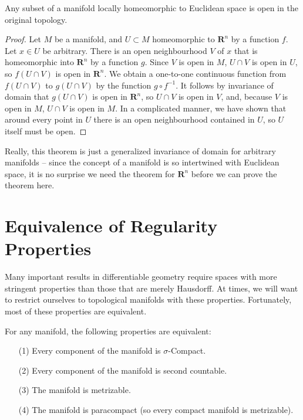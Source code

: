 \begin{theorem}
    Any subset of a manifold locally homeomorphic to Euclidean space is open in the original topology.
\end{theorem}
\begin{proof}
    Let $M$ be a manifold, and $U \subset M$ homeomorphic to $\mathbf{R}^n$ by a function $f$. Let $x \in U$ be arbitrary. There is an open neighbourhood $V$ of $x$ that is homeomorphic into $\mathbf{R}^n$ by a function $g$. Since $V$ is open in $M$, $U \cap V$ is open in $U$, so $f(U \cap V)$ is open in $\mathbf{R}^n$. We obtain a one-to-one continuous function from $f(U \cap V)$ to $g(U \cap V)$ by the function $g \circ f^{-1}$. It follows by invariance of domain that $g(U \cap V)$ is open in $\mathbf{R}^n$, so $U \cap V$ is open in $V$, and, because $V$ is open in $M$, $U \cap V$ is open in $M$. In a complicated manner, we have shown that around every point in $U$ there is an open neighbourhood contained in $U$, so $U$ itself must be open.
\end{proof}

Really, this theorem is just a generalized invariance of domain for arbitrary manifolds -- since the concept of a manifold is so intertwined with Euclidean space, it is no surprise we need the theorem for $\mathbf{R}^n$ before we can prove the theorem here.

\section{Equivalence of Regularity Properties}

Many important results in differentiable geometry require spaces with more stringent properties than those that are merely Hausdorff. At times, we will want to restrict ourselves to topological manifolds with these properties. Fortunately, most of these properties are equivalent.

\begin{theorem}
    For any manifold, the following properties are equivalent:
    \begin{enumerate}
        \item[(1)] Every component of the manifold is $\sigma$-Compact.
        \item[(2)] Every component of the manifold is second countable.
        \item[(3)] The manifold is metrizable.
        \item[(4)] The manifold is paracompact (so every compact manifold is metrizable).
    \end{enumerate}
\end{theorem}

